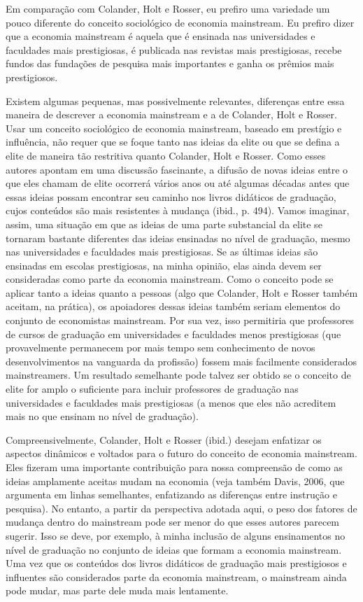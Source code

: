 \documentclass[a4paper,12pt]{article}[abntex2]
\begin{document}
Em comparação com Colander, Holt e Rosser, eu prefiro uma variedade um pouco diferente do conceito sociológico de economia mainstream. Eu prefiro dizer que a economia mainstream é aquela que é ensinada nas universidades e faculdades mais prestigiosas, é publicada nas revistas mais prestigiosas, recebe fundos das fundações de pesquisa mais importantes e ganha os prêmios mais prestigiosos.

Existem algumas pequenas, mas possivelmente relevantes, diferenças entre essa maneira de descrever a economia mainstream e a de Colander, Holt e Rosser. Usar um conceito sociológico de economia mainstream, baseado em prestígio e influência, não requer que se foque tanto nas ideias da elite ou que se defina a elite de maneira tão restritiva quanto Colander, Holt e Rosser. Como esses autores apontam em uma discussão fascinante, a difusão de novas ideias entre o que eles chamam de elite ocorrerá vários anos ou até algumas décadas antes que essas ideias possam encontrar seu caminho nos livros didáticos de graduação, cujos conteúdos são mais resistentes à mudança (ibid., p. 494). Vamos imaginar, assim, uma situação em que as ideias de uma parte substancial da elite se tornaram bastante diferentes das ideias ensinadas no nível de graduação, mesmo nas universidades e faculdades mais prestigiosas. Se as últimas ideias são ensinadas em escolas prestigiosas, na minha opinião, elas ainda devem ser consideradas como parte da economia mainstream. Como o conceito pode se aplicar tanto a ideias quanto a pessoas (algo que Colander, Holt e Rosser também aceitam, na prática), os apoiadores dessas ideias também seriam elementos do conjunto de economistas mainstream. Por sua vez, isso permitiria que professores de cursos de graduação em universidades e faculdades menos prestigiosas (que provavelmente permanecem por mais tempo sem conhecimento de novos desenvolvimentos na vanguarda da profissão) fossem mais facilmente considerados mainstreamers. Um resultado semelhante pode talvez ser obtido se o conceito de elite for amplo o suficiente para incluir professores de graduação nas universidades e faculdades mais prestigiosas (a menos que eles não acreditem mais no que ensinam no nível de graduação).

Compreensivelmente, Colander, Holt e Rosser (ibid.) desejam enfatizar os aspectos dinâmicos e voltados para o futuro do conceito de economia mainstream. Eles fizeram uma importante contribuição para nossa compreensão de como as ideias amplamente aceitas mudam na economia (veja também Davis, 2006, que argumenta em linhas semelhantes, enfatizando as diferenças entre instrução e pesquisa). No entanto, a partir da perspectiva adotada aqui, o peso dos fatores de mudança dentro do mainstream pode ser menor do que esses autores parecem sugerir. Isso se deve, por exemplo, à minha inclusão de alguns ensinamentos no nível de graduação no conjunto de ideias que formam a economia mainstream. Uma vez que os conteúdos dos livros didáticos de graduação mais prestigiosos e influentes são considerados parte da economia mainstream, o mainstream ainda pode mudar, mas parte dele muda mais lentamente.
\end{document}

